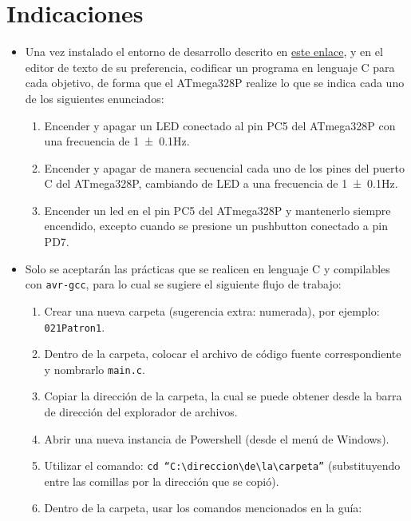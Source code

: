 \documentclass[10pt,letterpaper]{article}
\begin{document}
\section{Indicaciones}
\begin{itemize}
    \item Una vez instalado el entorno de desarrollo descrito en \href{https://github.com/dagmtz/I7266/blob/main/005_Guides/AVR_env_setup_ES/AVR_env_setup_ES.pdf}{este enlace}, y en el editor de texto de su preferencia, codificar un programa en lenguaje C para cada objetivo, de forma que el ATmega328P realize lo que se indica cada uno de los siguientes enunciados:
    \begin{enumerate}[label*=\arabic*.]
        \item Encender y apagar un LED conectado al pin PC5 del ATmega328P con una frecuencia de \num{1 \pm 0.1}\unit{\hertz}.
        \item Encender y apagar de manera secuencial cada uno de los pines del puerto C del ATmega328P, cambiando de LED a una frecuencia de \num{1 \pm 0.1}\unit{\hertz}.
        \item Encender un led en el pin PC5 del ATmega328P y mantenerlo siempre encendido, excepto cuando se presione un pushbutton conectado a pin PD7.
    \end{enumerate}
    \pagebreak
    \item Solo se aceptarán las prácticas que se realicen en lenguaje C y compilables con \texttt{avr-gcc}, para lo cual se sugiere el siguiente flujo de trabajo:
    \begin{enumerate}
        \item Crear una nueva carpeta (sugerencia extra: numerada), por ejemplo: \texttt{021\textunderscore Patron1}.
        \item Dentro de la carpeta, colocar el archivo de código fuente correspondiente y nombrarlo \texttt{main.c}.
        \item Copiar la dirección de la carpeta, la cual se puede obtener desde la barra de dirección del explorador de archivos.
        \item Abrir una nueva instancia de Powershell (desde el menú de Windows).
        \item Utilizar el comando: \texttt{cd ``C:\textbackslash direccion\textbackslash de\textbackslash la\textbackslash carpeta''} (substituyendo entre las comillas por la dirección que se copió).
        \item Dentro de la carpeta, usar los comandos mencionados en la guía:

\end{enumerate}
\end{itemize}
\end{document}
